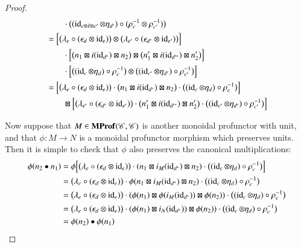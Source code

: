\documentclass[12pt,oneside,article,draft]{memoir}
\begin{document}
\begin{proof}
\begin{align*}
		&\qquad \cdot\bigl((\operatorname{id}_{c\otimes I\otimes c'}\otimes\eta_{d'})\circ(\rho_c^{-1}\otimes\rho_{c'}^{-1})\bigr) \\
		&= \Bigl[\bigl(\lambda_e\circ(\epsilon_d\otimes\operatorname{id}_e)\bigr)\otimes\bigl(\lambda_{e'}\circ(\epsilon_{d'}\otimes\operatorname{id}_{e'})\bigr)\Bigr] \\
		&\qquad \cdot\Bigl[\bigl(n_1\boxtimes i(\operatorname{id}_{d^*})\boxtimes n_2\bigr)\boxtimes\bigl(n'_1\boxtimes i(\operatorname{id}_{d'^*})\boxtimes n'_2\bigr)\Bigr] \\
		&\qquad \cdot\Bigl[\bigl((\operatorname{id}_c\otimes\eta_d)\circ\rho_c^{-1}\bigr)\otimes\bigl((\operatorname{id}_{c'}\otimes\eta_{d'})\circ\rho_{c'}^{-1}\bigr)\Bigr] \\
		&= \Bigl[\bigl(\lambda_e\circ(\epsilon_d\otimes\operatorname{id}_e)\bigr)\cdot\bigl(n_1\boxtimes i(\operatorname{id}_{d^*})\boxtimes n_2\bigr)\cdot\bigl((\operatorname{id}_c\otimes\eta_d)\circ\rho_c^{-1}\bigr)\Bigr] \\
		&\qquad \boxtimes\Bigl[\bigl(\lambda_{e'}\circ(\epsilon_{d'}\otimes\operatorname{id}_{e'})\bigr)\cdot\bigl(n'_1\boxtimes i(\operatorname{id}_{d'^*})\boxtimes n'_2\bigr)\cdot\bigl((\operatorname{id}_{c'}\otimes\eta_{d'})\circ\rho_{c'}^{-1}\bigr)\Bigr]
	\end{align*}

  Now suppose that $M\in\mathbf{MProf}(\mathscr{C},\mathscr{C})$ is another monoidal profunctor with unit, and that $\phi\colon M\to N$ is a monoidal profunctor morphism which preserves units. Then it is simple to check that $\phi$ also preserves the canonical multiplications:
  \begin{align*}
    \phi(n_2\bullet n_1) &= \phi\Bigl[\bigl(\lambda_e\circ(\epsilon_d\otimes\operatorname{id}_e)\bigr)\cdot(n_1\boxtimes i_M(\operatorname{id}_{d^*})\boxtimes n_2)\cdot\bigl((\operatorname{id}_c\otimes \eta_d)\circ\rho_c^{-1}\bigr)\Bigr]\\
    &= \bigl(\lambda_e\circ(\epsilon_d\otimes\operatorname{id}_e)\bigr)\cdot\phi(n_1\boxtimes i_M(\operatorname{id}_{d^*})\boxtimes n_2)\cdot\bigl((\operatorname{id}_c\otimes \eta_d)\circ\rho_c^{-1}\bigr) \\
    &= \bigl(\lambda_e\circ(\epsilon_d\otimes\operatorname{id}_e)\bigr)\cdot(\phi(n_1)\boxtimes \phi(i_M(\operatorname{id}_{d^*}))\boxtimes \phi(n_2))\cdot\bigl((\operatorname{id}_c\otimes \eta_d)\circ\rho_c^{-1}\bigr) \\
    &= \bigl(\lambda_e\circ(\epsilon_d\otimes\operatorname{id}_e)\bigr)\cdot(\phi(n_1)\boxtimes i_N(\operatorname{id}_{d^*}))\boxtimes \phi(n_2))\cdot\bigl((\operatorname{id}_c\otimes \eta_d)\circ\rho_c^{-1}\bigr) \\
    &= \phi(n_2)\bullet\phi(n_1)
  \end{align*}
\end{proof}
\end{document}
